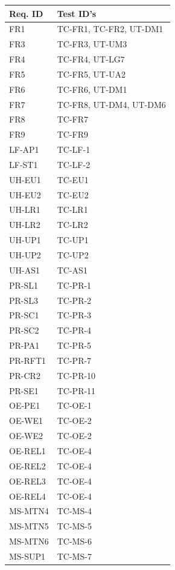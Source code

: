 \documentclass[12pt, titlepage]{article}
\begin{document}
\begin{longtable}{|l|l|}
  \hline
  \textbf{Req. ID} & \textbf{Test ID's} \\
  \hline
  FR1 & TC-FR1, TC-FR2, UT-DM1\\ \hline
  FR3 & TC-FR3, UT-UM3\\ \hline
  FR4 & TC-FR4, UT-LG7\\ \hline
  FR5 & TC-FR5, UT-UA2\\ \hline
  FR6 & TC-FR6, UT-DM1\\ \hline
  FR7 & TC-FR8, UT-DM4, UT-DM6\\ \hline
  FR8 & TC-FR7\\ \hline
  FR9 & TC-FR9\\ \hline
  LF-AP1 & TC-LF-1 \\ \hline
  LF-ST1 & TC-LF-2 \\ \hline
  UH-EU1 & TC-EU1\\ \hline
  UH-EU2 & TC-EU2\\ \hline
  UH-LR1 & TC-LR1\\ \hline
  UH-LR2 & TC-LR2\\ \hline
  UH-UP1 & TC-UP1\\ \hline
  UH-UP2 & TC-UP2\\ \hline
  UH-AS1 & TC-AS1\\ \hline
  PR-SL1 & TC-PR-1\\ \hline
  PR-SL3 & TC-PR-2\\ \hline
  PR-SC1 & TC-PR-3\\ \hline
  PR-SC2 & TC-PR-4\\ \hline
  PR-PA1 & TC-PR-5\\ \hline
  PR-RFT1 & TC-PR-7\\ \hline
  PR-CR2 & TC-PR-10\\ \hline
  PR-SE1 & TC-PR-11\\ \hline
  OE-PE1 & TC-OE-1 \\ \hline
  OE-WE1 & TC-OE-2 \\ \hline
  OE-WE2 & TC-OE-2 \\ \hline
  OE-REL1 & TC-OE-4 \\ \hline
  OE-REL2 & TC-OE-4 \\ \hline
  OE-REL3 & TC-OE-4 \\ \hline
  OE-REL4 & TC-OE-4 \\ \hline
  MS-MTN4 & TC-MS-4 \\ \hline
  MS-MTN5 & TC-MS-5 \\ \hline
  MS-MTN6 & TC-MS-6 \\ \hline
  MS-SUP1 & TC-MS-7 \\ \hline

\end{longtable}
\end{document}

